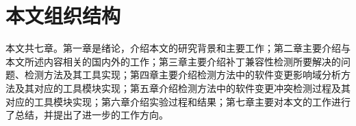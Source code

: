 %
%
%
%
%


\section{本文组织结构}

本文共七章。第一章是绪论，介绍本文的研究背景和主要工作；第二章主要介绍与本文所述内容相关的国内外的工作；第三章主要介绍补丁兼容性检测所要解决的问题、检测方法及其工具实现；第四章主要介绍检测方法中的软件变更影响域分析方法及其对应的工具模块实现；第五章介绍检测方法中的软件变更冲突检测过程及其对应的工具模块实现；第六章介绍实验过程和结果；第七章主要对本文的工作进行了总结，并提出了进一步的工作方向。


